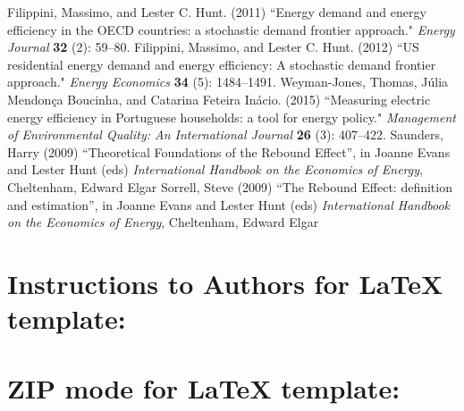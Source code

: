 \documentclass[3p,times,procedia]{elsarticle}
\begin{document}

%
%




 \begin{thebibliography}{}


{F}ilippini, Massimo, and Lester C. Hunt. (2011) ``Energy demand and
energy efficiency in the OECD countries: a stochastic demand frontier
approach." {\it Energy Journal} {\bf 32} (2): 59--80.
Filippini, Massimo, and Lester C. Hunt. (2012) ``US residential
energy demand and energy efficiency: A stochastic demand frontier
approach." {\it Energy Economics} {\bf 34} (5): 1484--1491.
Weyman-Jones, Thomas, J\'{u}lia Mendon\c{c}a Boucinha, and Catarina
Feteira In\'{a}cio. (2015) ``Measuring electric energy efficiency in
Portuguese households: a tool for energy policy." {\it Management of Environmental Quality: An International Journal} {\bf 26} (3): 407--422.
\bibitem{} 
Saunders, Harry (2009) ``Theoretical Foundations of the Rebound Effect'', in Joanne Evans and Lester Hunt (eds) {\it International Handbook on the Economics of Energy}, Cheltenham, Edward Elgar
\bibitem{} 
Sorrell, Steve (2009) ``The Rebound Effect: definition and estimation'', in Joanne Evans and Lester Hunt (eds) {\it International Handbook on the Economics of Energy}, Cheltenham, Edward Elgar 
 \end{thebibliography}

\clearpage

\normalMode

\section*{Instructions to Authors for LaTeX template:}

\section{ZIP mode for LaTeX template:}
\end{document}
